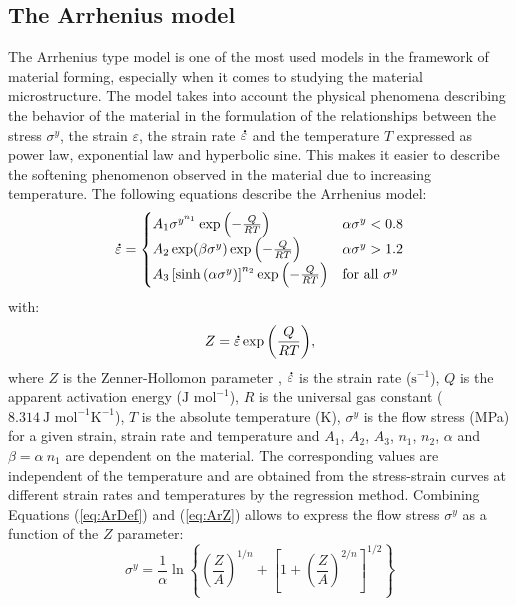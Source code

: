 \documentclass[metals,article,submit,pdftex,moreauthors]{Definitions/mdpi}
\DeclareRobustCommand{\mdot}[1]{\accentset{\mbox{\bfseries .}}{#1}}
\DeclareRobustCommand{\ps}{\text{s}^{-1}}
\begin{document}
\subsection{The Arrhenius model\label{sec:ARmodel}}

The Arrhenius type model \cite{Sellars-1966} is one of the most used models in the framework of material forming, especially when it comes to studying the material microstructure.
The model takes into account the physical phenomena describing the behavior of the material in the formulation of the relationships between the stress $\sigma^y$, the strain $\varepsilon$, the strain rate $\mdot\varepsilon$ and the temperature $T$ expressed as power law, exponential law and hyperbolic sine.
This makes it easier to describe the softening phenomenon observed in the material due to increasing temperature.
The following equations describe the Arrhenius model:
\begin{equation}
\mdot\varepsilon =
\begin{cases}
A_1 \sigma^{y^{n_1}} \exp{\left(-\frac{Q}{RT}\right)} & \alpha\sigma^y < 0.8\\
A_2 \exp(\beta\sigma^y) \exp{\left(-\frac{Q}{RT}\right)} & \alpha\sigma^y > 1.2\\
A_3 \left[\sinh{\left(\alpha\sigma^y\right)}\right]^{n_2} \exp{\left(-\frac{Q}{RT}\right)} & \text{for all }\sigma^y
\end{cases}
\label{eq:ArDef}
\end{equation}
with:
\begin{equation}
Z = \mdot\varepsilon \exp{\left(\frac{Q}{RT}\right)}, \label{eq:ArZ}
\end{equation}
where $Z$ is the Zenner-Hollomon parameter \cite{Zener-1944}, $\mdot\varepsilon$ is the strain rate ($\ps$), $Q$ is the apparent activation energy ($\text{J~mol}^{-1}$), $R$ is the universal gas constant ($8.314~\text{J~mol}^{-1} \text{K}^{-1}$), $T$ is the absolute temperature (K), $\sigma^y$ is the flow stress (MPa) for a given strain, strain rate and temperature and $A_1$, $A_2$, $A_3$, $n_1$, $n_2$, $\alpha$ and $\beta=\alpha~n_1$ are dependent on the material.
The corresponding values are independent of the temperature and are obtained from the stress-strain curves at different strain rates and temperatures by the regression method.
Combining Equations (\ref{eq:ArDef}) and (\ref{eq:ArZ}) allows to express the flow stress $\sigma^y$ as a function of the $Z$ parameter:
\begin{equation}
\sigma^y = \frac{1}{\alpha} \ln\left\{\left(\frac{Z}{A}\right)^{1/n} + \left[1 + \left(\frac{Z}{A}\right)^{2/n}\right]^{1/2}\right\}
\end{equation}
\end{document}
